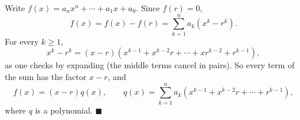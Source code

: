 Write $f(x)=a_nx^n+\cdots+a_1x+a_0$. Since $f(r)=0$,
\[f(x)=f(x)-f(r)=\sum_{k=1}^{n}a_k\left(x^k-r^k\right).\]
For every $k\ge1$,
\[x^k-r^k=(x-r)\left(x^{k-1}+x^{k-2}r+\cdots+xr^{k-2}+r^{k-1}\right),\]
as one checks by expanding (the middle terms cancel in pairs). So every term of the sum has the factor $x-r$, and
\[f(x)=(x-r)q(x),\qquad q(x)=\sum_{k=1}^{n}a_k\left(x^{k-1}+x^{k-2}r+\cdots+r^{k-1}\right),\]
where $q$ is a polynomial. $\blacksquare$
